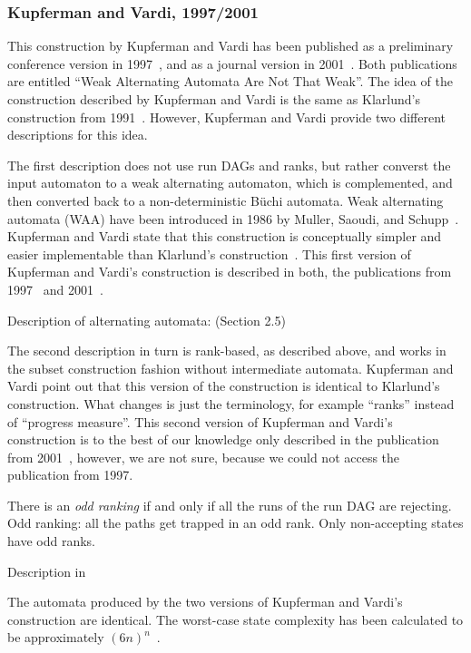 \subsubsection{Kupferman and Vardi, 1997/2001}
This construction by Kupferman and Vardi has been published as a preliminary conference version in 1997~\cite{1997_vardi}, and as a journal version in 2001~\cite{Kupferman:2001}. Both publications are entitled ``Weak Alternating Automata Are Not That Weak''. The idea of the construction described by Kupferman and Vardi is the same as Klarlund's construction from 1991~\cite{1991_klarlund}. However, Kupferman and Vardi provide two different descriptions for this idea.

The first description does not use run DAGs and ranks, but rather converst the input automaton to a weak alternating automaton, which is complemented, and then converted back to a non-deterministic Büchi automata. Weak alternating automata (WAA) have been introduced in 1986 by Muller, Saoudi, and Schupp~\cite{1986_muller}. Kupferman and Vardi state that this construction is conceptually simpler and easier implementable than Klarlund's construction~\cite{1991_klarlund}. This first version of Kupferman and Vardi's construction is described in both, the publications from 1997~\cite{1997_vardi} and 2001~\cite{Kupferman:2001}.

Description of alternating automata: \cite{1996_vardi} (Section 2.5)


The second description in turn is rank-based, as described above, and works in the subset construction fashion without intermediate automata. Kupferman and Vardi point out that this version of the construction is identical to Klarlund's construction. What changes is just the terminology, for example ``ranks'' instead of ``progress measure''. This second version of Kupferman and Vardi's construction is to the best of our knowledge only described in the publication from 2001~\cite{Kupferman:2001}, however, we are not sure, because we could not access the publication from 1997\cite{1997_vardi}.

There is an \textit{odd ranking} if and only if all the runs of the run DAG are rejecting. Odd ranking: all the paths get trapped in an odd rank. Only non-accepting states have odd ranks.

Description in \cite{fogarty2013unifying}~\cite{2007_vardi}

The automata produced by the two versions of Kupferman and Vardi's construction are identical. The worst-case state complexity has been calculated to be approximately $(6n)^n$~\cite{schewe2009buchi}\cite{2007_vardi}.

